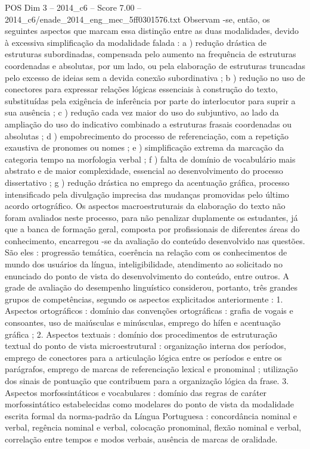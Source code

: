 \begin{textsample}{POS Dim 3 – 2014\_c6 – Score 7.00 – 2014\_c6/enade\_2014\_eng\_mec\_5ff0301576.txt}
Observam -se, então, os seguintes aspectos que marcam essa distinção entre as duas modalidades, devido à excessiva simplificação da modalidade falada : a ) redução drástica de estruturas subordinadas, compensada pelo aumento na frequência de estruturas coordenadas e absolutas, por um lado, ou pela elaboração de estruturas truncadas pelo excesso de ideias sem a devida conexão subordinativa ; b ) redução no uso de conectores para expressar relações lógicas essenciais à construção do texto, substituídas pela exigência de inferência por parte do interlocutor para suprir a sua ausência ; c ) redução cada vez maior do uso do subjuntivo, ao lado da ampliação do uso do indicativo combinado a estruturas frasais coordenadas ou absolutas ; d ) empobrecimento do processo de referenciação, com a repetição exaustiva de pronomes ou nomes ; e ) simplificação extrema da marcação da categoria tempo na morfologia verbal ; f ) falta de domínio de vocabulário mais abstrato e de maior complexidade, essencial ao desenvolvimento do processo dissertativo ; g ) redução drástica no emprego da acentuação gráfica, processo intensificado pela divulgação imprecisa das mudanças promovidas pelo último acordo ortográfico.
Os aspectos macroestruturais da elaboração do texto não foram avaliados neste processo, para não penalizar duplamente os estudantes, já que a banca de formação geral, composta por profissionais de diferentes áreas do conhecimento, encarregou -se da avaliação do conteúdo desenvolvido nas questões.
São eles : progressão temática, coerência na relação com os conhecimentos de mundo dos usuários da língua, inteligibilidade, atendimento ao solicitado no enunciado do ponto de vista do desenvolvimento do conteúdo, entre outros.
A grade de avaliação do desempenho linguístico considerou, portanto, três grandes grupos de competências, segundo os aspectos explicitados anteriormente : 1.
Aspectos ortográficos : domínio das convenções ortográficas : grafia de vogais e consoantes, uso de maiúsculas e minúsculas, emprego do hífen e acentuação gráfica ; 2.
Aspectos textuais : domínio dos procedimentos de estruturação textual do ponto de vista microestrutural : organização interna dos períodos, emprego de conectores para a articulação lógica entre os períodos e entre os parágrafos, emprego de marcas de referenciação lexical e pronominal ; utilização dos sinais de pontuação que contribuem para a organização lógica da frase. 3.
Aspectos morfossintáticos e vocabulares : domínio das regras de caráter morfossintático estabelecidas como modelares do ponto de vista da modalidade escrita formal da norma-padrão da Língua Portuguesa : concordância nominal e verbal, regência nominal e verbal, colocação pronominal, flexão nominal e verbal, correlação entre tempos e modos verbais, ausência de marcas de oralidade.

\end{textsample}
